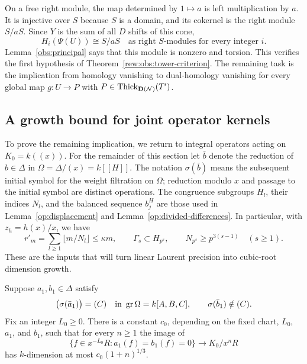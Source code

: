 On a free right module, the map determined by $1\mapsto a$ is
left multiplication by $a$.  It is injective over $S$ because
$S$ is a domain, and its cokernel is the right module $S/aS$.
Since $Y$ is the sum of all $D$ shifts of this cone,
\begin{equation}
\label{rew:obs:source-homology}
 H_i(\Psi(U))\cong S/aS
 \quad\text{as right $S$-modules for every integer }i.
\end{equation}
Lemma~\ref{obs:principal} says that this module is nonzero and
torsion.  This verifies the first hypothesis of
Theorem~\ref{rew:obs:tower-criterion}.  The remaining task is
the implication from homology vanishing to dual-homology
vanishing for every global map $g:U\to P$ with
$P\in\operatorname{Thick}_{\mathbf D(\mathcal N)}(T')$.

\subsection{A growth bound for joint operator kernels}

To prove the remaining implication, we return to integral operators
acting on $K_0=k((x))$.  For the remainder of this section let
$\bar b$ denote the reduction of $b\in\Delta$ in
$\Omega=\Delta/(x)=k[[H]]$.  The notation $\sigma(\bar b)$ means
the subsequent initial symbol for the weight filtration on
$\Omega$; reduction modulo $x$ and passage to the initial symbol
are distinct operations.
The congruence subgroups $H_l$, their indices $N_l$, and the balanced
sequence $b_j^H$ are those used in
Lemma~\ref{op:displacement} and
Lemma~\ref{op:divided-differences}.  In particular, with
$z_h=h(x)/x$, we have
\begin{equation}
\label{obs:growth-inputs}
 r'_m=\sum_{l\geq1}\lfloor m/N_l\rfloor\leq\kappa m,
 \qquad
 \Gamma_s\subset H_{p^s},\qquad
 N_{p^s}\geq p^{3(s-1)}\quad(s\geq1).
\end{equation}
These are the inputs that will turn linear Laurent precision into
cubic-root dimension growth.

\begin{lemma}
\label{obs:growth}
Suppose $a_1,b_1\in\Delta$ satisfy
\[
 \bigl(\sigma(\bar a_1)\bigr)=(C)
 \quad\text{in }\operatorname{gr}\Omega=k[A,B,C],
 \qquad \sigma(\bar b_1)\notin(C).
\]
Fix an integer $L_0\geq0$.  There is a constant $c_0$, depending on
the fixed chart, $L_0$, $a_1$, and $b_1$, such that for every $n\geq1$
the image of
\[
 \{f\in x^{-L_0}R:a_1(f)=b_1(f)=0\}
       \longrightarrow K_0/x^nR
\]
has $k$-dimension at most $c_0(1+n)^{1/3}$.
\end{lemma}

